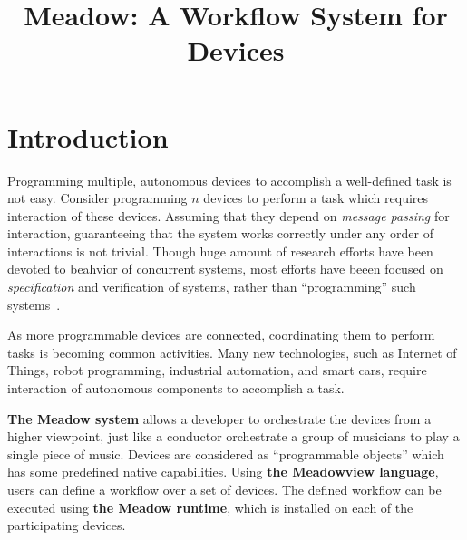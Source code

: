 \documentclass{note}
\begin{document}
\small


\title{\large\bf{}\textcolor{blue2}{Meadow:  A Workflow System for Devices}}
\date{}
\maketitle

\section{Introduction}
Programming multiple, autonomous devices to accomplish a well-defined
task is not easy. Consider programming $n$ devices to 
perform a task which requires interaction of these devices.
Assuming that they depend on {\em message passing\/} for interaction,
guaranteeing that the system works correctly under any order of
interactions is not trivial. Though huge amount of research efforts
have been devoted to beahvior of concurrent systems, 
most efforts have beeen focused on
{\em specification\/} and verification of systems, rather than 
``programming'' such systems~\cite{Hoare85,MP91,Milner89,Murata89}. 

As more programmable devices are connected, coordinating them
to perform tasks is becoming common activities. Many new 
technologies, such as Internet of Things, robot programming, industrial
automation, and smart cars, require interaction of autonomous components to
accomplish a task. 

\textcolor{blue2}{\textbf{The Meadow system}} allows a developer to 
orchestrate the devices from a higher viewpoint, just like a
conductor orchestrate a group of musicians to play a single piece of music. 
Devices are considered as ``programmable objects'' which has some predefined
native capabilities. Using \textcolor{blue2}{\textbf{the Meadowview
    language}}, users 
can define a workflow over a set of devices. The defined workflow can be
executed using \textcolor{blue2}{\textbf{the Meadow runtime}}, which is
installed on each of the participating devices. 
 
\end{document}
